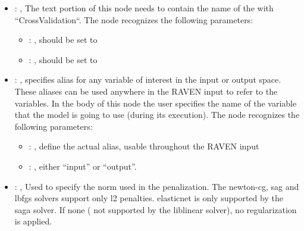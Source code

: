 \begin{itemize}
\begin{itemize}
        \item {}: ,
          List of IDs of features/variables to include in the transformation process.

        \item {}: ,
          Which space to search? Target or Feature?
      \end{itemize}

    \item {}: ,
      The text portion of this node needs to contain the name of the  with
               ``CrossValidation``.
      The  node recognizes the following parameters:
        \begin{itemize}
          \item {}: ,
            should be set to 
          \item {}: ,
            should be set to 
      \end{itemize}

    \item {}: ,
      specifies alias for         any variable of interest in the input or output space. These
      aliases can be used anywhere in the RAVEN input to         refer to the variables. In the body
      of this node the user specifies the name of the variable that the model is going to use
      (during its execution).
      The  node recognizes the following parameters:
        \begin{itemize}
          \item {}: ,
            define the actual alias, usable throughout the RAVEN input
          \item {}: ,
            either ``input'' or ``output''.
      \end{itemize}

    \item {}: ,
      Used to specify the norm used in the penalization. The newton-cg, sag and lbfgs solvers
      support only l2 penalties. elasticnet is only supported by the saga solver. If none (
      not supported by the liblinear solver), no regularization is applied.


\end{itemize}
